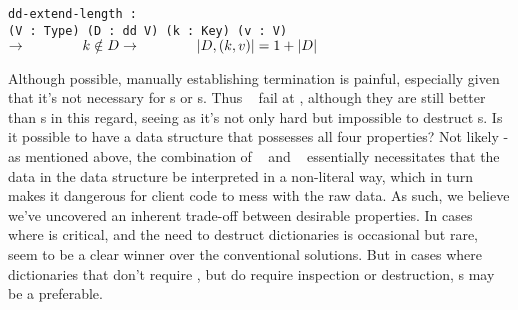 \texttt{dd-extend-length :\\
\phantom{xxxxx} (V : Type) (D : dd V) (k : Key) (v : V) $\rightarrow \\
\phantom{xxxxxxx} k \notin D \rightarrow \\
\phantom{xxxxxxx} |D, (k, v)| = 1 + |D|$}

Although possible, manually establishing termination is painful, especially given that it's not necessary
for {\SAL}s or {\CAL}s. Thus \dds~ fail at \EzDstr, although they are still better than {\FPF}s in this
regard, seeing as it's not only hard but impossible to destruct {\FPF}s. Is it possible to have a data
structure that possesses all four properties? Not likely - as mentioned above, the combination of
\SemInj~ and \SemTot~ essentially
necessitates that the data in the data structure be interpreted in a non-literal way, which in turn
makes it dangerous for client code to mess with the raw data. As such, we believe we've uncovered an
inherent trade-off between desirable properties. In cases where \EqDec{} is critical,
and the need to destruct dictionaries is occasional but rare, \dds{} seem to be a clear winner over
the conventional solutions. But in cases where dictionaries that don't require \EqDec,
but do require inspection or destruction, {\CAL}s may be a preferable.
